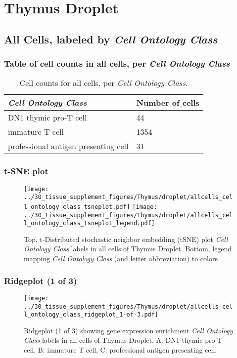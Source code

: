 \clearpage
\section{Thymus Droplet}

\subsection{All Cells, labeled by \emph{Cell Ontology Class}}
\subsubsection{Table of cell counts in all cells, per \emph{Cell Ontology Class}}\begin{table}[h]
\centering
\label{my-label}
\begin{tabular}{@{}ll@{}}
\toprule

\emph{Cell Ontology Class}& Number of cells \\ \midrule
DN1 thymic pro-T cell & 44 \\

immature T cell & 1354 \\

professional antigen presenting cell & 31 \\
\bottomrule
\end{tabular}
\caption{Cell counts for all cells, per \emph{Cell Ontology Class}.}
\end{table}

\clearpage
\subsubsection{t-SNE plot}
\begin{figure}[h]
\centering
\texttt{[image: ../30\_tissue\_supplement\_figures/Thymus/droplet/allcells\_cell\_ontology\_class\_tsneplot.pdf]}
\texttt{[image: ../30\_tissue\_supplement\_figures/Thymus/droplet/allcells\_cell\_ontology\_class\_tsneplot\_legend.pdf]}
\caption{Top, t-Distributed stochastic neighbor embedding (tSNE) plot  \emph{Cell Ontology Class} labels in all cells of Thymus Droplet. Bottom, legend mapping \emph{Cell Ontology Class} (and letter abbreviation) to colors}
\end{figure}


\clearpage

\subsubsection{Ridgeplot (1 of 3)}
\begin{figure}[h]
\centering
\texttt{[image: ../30\_tissue\_supplement\_figures/Thymus/droplet/allcells\_cell\_ontology\_class\_ridgeplot\_1-of-3.pdf]}

\caption{ Ridgeplot (1 of 3)  showing gene expression enrichment \emph{Cell Ontology Class} labels in all cells of Thymus Droplet. A: DN1 thymic pro-T cell, B: immature T cell, C: professional antigen presenting cell.}
\end{figure}


